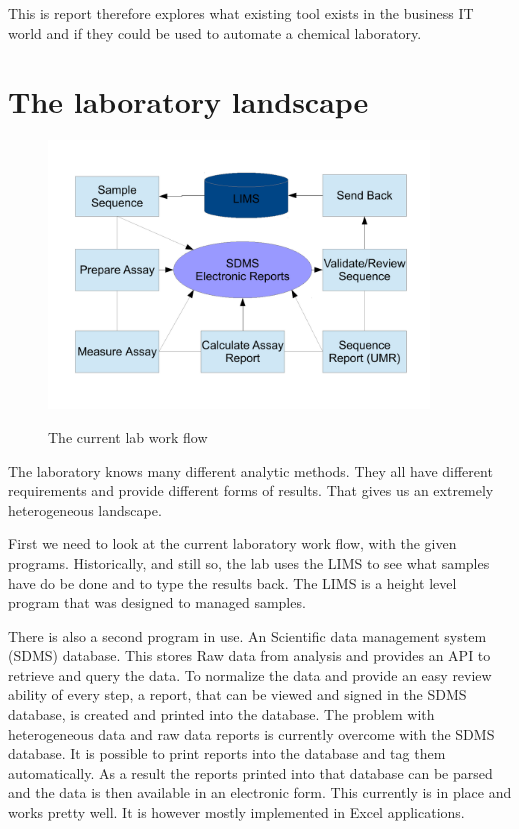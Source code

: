 \documentclass[paper=a4,twoside=false,BCOR=0mm,DIV=calc,fontsize=12pt]{scrartcl}
\begin{document}
This is report therefore explores what existing tool exists in the business IT world and if they could be used to automate a chemical laboratory.


\section{The laboratory landscape}

\begin{figure}
    \begin{center}
      \includegraphics[width=0.9\textwidth]{./img/Laboverview.pdf}\\
    \end{center}
  \caption{The current lab work flow}
  \label{CurrentLabWorkflow}
\end{figure} 


The laboratory knows many different analytic methods. They all have different requirements and provide different forms of results. That gives us an extremely heterogeneous landscape. 

First we need to look at the current laboratory work flow, with the given programs. Historically, and still so, the lab uses the LIMS to see what samples have do be done and to type the results back. The LIMS is a height level program that was designed to managed samples.

There is also a second program in use. An Scientific data management system (SDMS) database. This stores Raw data from analysis and provides an API to retrieve and query the data.
To normalize the data and provide an easy review ability of every step, a report, that can be viewed and signed in the SDMS database, is created and printed into the database.
The problem with heterogeneous data and raw data reports is currently overcome with the SDMS database. It is possible to print reports into the database and tag them automatically. As a result the reports printed into that database can be parsed and the data is then available in an electronic form. This currently is in place and works pretty well.
It is however mostly implemented in Excel \cite{excel} applications.
\end{document}
